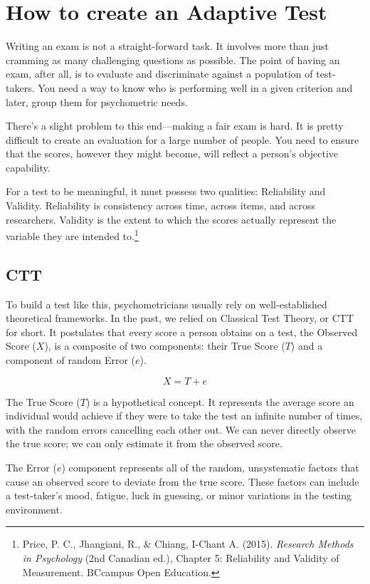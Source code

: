 \documentclass{article}
\begin{document}
\section*{How to create an Adaptive Test}

Writing an exam is not a straight-forward task. It involves more than just 
cramming as many challenging questions as possible. The point of having an exam, 
after all, is to evaluate and discriminate against a population of test-takers. 
You need a way to know who is performing well in a given criterion and later, 
group them for psychometric needs. 

There’s a slight problem to this end—making a fair exam is hard. It is pretty 
difficult to create an evaluation for a large number of people. You need to 
ensure that the scores, however they might become, will reflect a person’s 
objective capability.

For a test to be meaningful, it must possess two qualities: Reliability and 
Validity. Reliability is consistency across time, across items, and across 
researchers. Validity is the extent to which the scores actually represent 
the variable they are intended to.\footnote{Price, P. C., Jhangiani, R., \& Chiang, I-Chant A. (2015). \textit{Research Methods in Psychology} (2nd Canadian ed.), Chapter 5: Reliability and Validity of Measurement. BCcampus Open Education.}

\subsection*{CTT}

To build a test like this, psychometricians usually rely on well-established 
theoretical frameworks. In the past, we relied on Classical Test Theory, or CTT 
for short. It postulates that every score a person obtains on a test, the 
Observed Score ($X$), is a composite of two components: their True Score ($T$) 
and a component of random Error ($e$). 

\[
X = T + e
\]

The True Score ($T$) is a hypothetical concept. It represents the average score an 
individual would achieve if they were to take the test an infinite number of times,
 with the random errors cancelling each other out. We can never directly observe the
  true score; we can only estimate it from the observed score. 

The Error ($e$) component represents all of the random, unsystematic factors that cause an observed score to deviate from the true score. These factors can include a test-taker's mood, fatigue, luck in guessing, or minor variations in the testing environment.
\end{document}
